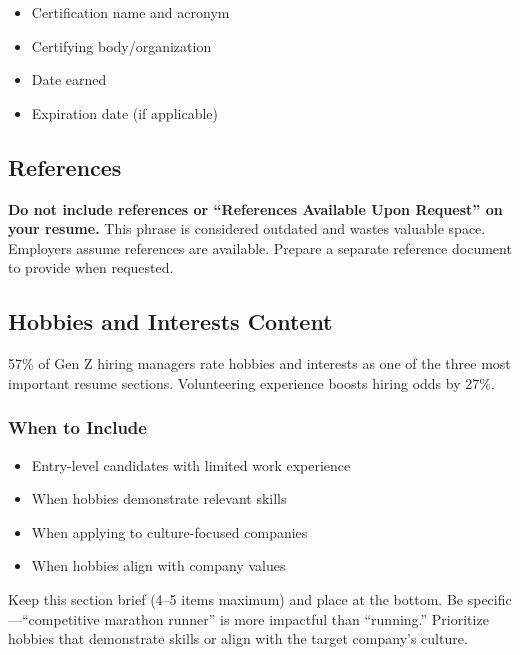 \documentclass[11pt,a4paper]{article}
\begin{document}
\begin{itemize}
    \item Certification name and acronym
    \item Certifying body/organization
    \item Date earned
    \item Expiration date (if applicable)
\end{itemize}

\subsection{References}

\begin{warning}
\textbf{Do not include references or ``References Available Upon Request'' on your resume.} This phrase is considered outdated and wastes valuable space. Employers assume references are available. Prepare a separate reference document to provide when requested.
\end{warning}

\subsection{Hobbies and Interests Content}

\begin{keystat}
57\% of Gen Z hiring managers rate hobbies and interests as one of the three most important resume sections. Volunteering experience boosts hiring odds by 27\%.
\end{keystat}

\subsubsection{When to Include}

\begin{itemize}
    \item Entry-level candidates with limited work experience
    \item When hobbies demonstrate relevant skills
    \item When applying to culture-focused companies
    \item When hobbies align with company values
\end{itemize}

\begin{bestpractice}
Keep this section brief (4--5 items maximum) and place at the bottom. Be specific---``competitive marathon runner'' is more impactful than ``running.'' Prioritize hobbies that demonstrate skills or align with the target company's culture.
\end{bestpractice}
\end{document}
